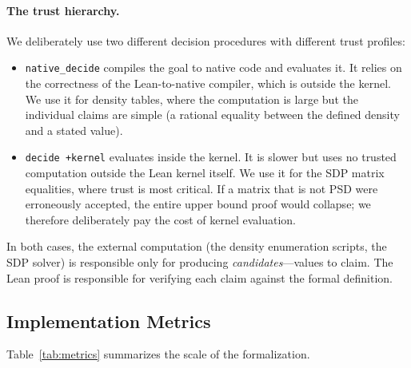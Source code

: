 \documentclass{article}
\newcommand{\lean}[1]{\texttt{#1}}
\begin{document}
\paragraph{The trust hierarchy.}
We deliberately use two different decision procedures with different trust
profiles:
\begin{itemize}
  \item \lean{native\_decide} compiles the goal to native code and evaluates
    it.  It relies on the correctness of the Lean-to-native compiler, which is
    outside the kernel.  We use it for density tables, where the computation is
    large but the individual claims are simple (a rational equality between the
    defined density and a stated value).

  \item \lean{decide +kernel} evaluates inside the kernel.  It is slower but
    uses no trusted computation outside the Lean kernel itself.  We use it for
    the SDP matrix equalities, where trust is most critical.  If a matrix
    that is not PSD were erroneously accepted, the entire upper bound proof
    would collapse; we therefore deliberately pay the cost of kernel evaluation.
\end{itemize}
In both cases, the external computation (the density enumeration scripts, the
SDP solver) is responsible only for producing \emph{candidates}---values to
claim.  The Lean proof is responsible for verifying each claim against the
formal definition.

\subsection{Implementation Metrics}

Table~\ref{tab:metrics} summarizes the scale of the formalization.
\end{document}
